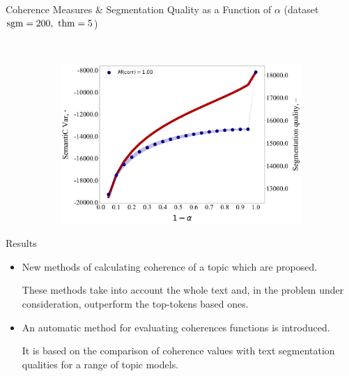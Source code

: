 \documentclass[russian]{beamer}
\begin{document}
\begin{frame}{Coherence Measures \& Segmentation Quality as a Function of $\alpha$ (dataset $\sgm=200,\ \thm=5$)}
\begin{figure}[h]
\begin{subfigure}[t]{0.48\textwidth}
    \end{subfigure}
    ~
    \begin{subfigure}[t]{0.48\textwidth}
      \includegraphics[width=\linewidth]{semantic_var-iteration.jpg}
    \end{subfigure}
  \end{figure}
\end{frame}

\begin{frame}{Results}
  \begin{itemize}
  \setlength\itemsep{0.5cm}
  \item
    New methods of calculating coherence of a topic which are proposed.
    
    \smallskip
    
    These methods take into account the whole text and, in the problem under consideration, outperform the top-tokens based ones.
  \item
    An automatic method for evaluating coherences functions is introduced.
    
    \smallskip
    
    It is based on the comparison of coherence values with text segmentation qualities for a range of topic models.
  \end{itemize}
\end{frame}
\end{document}
